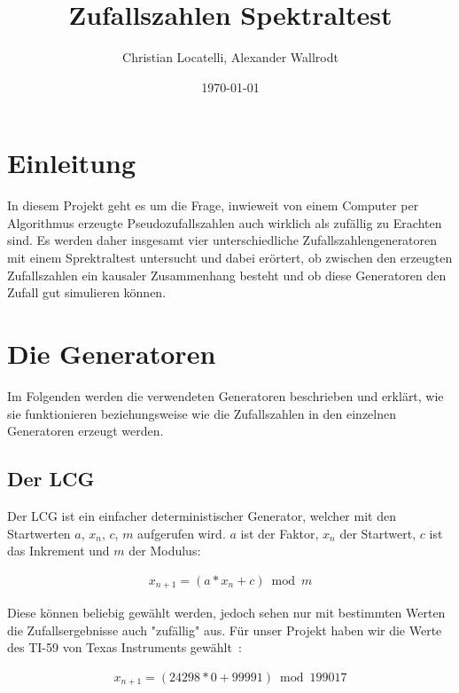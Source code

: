 \documentclass[12pt]{article}
\title{\textbf{Zufallszahlen Spektraltest}}
\author{Christian Locatelli, Alexander Wallrodt}
\date{\today}
\begin{document}
    \maketitle
    \clearpage

    \tableofcontents
    \listoftables
    \listoffigures

    \clearpage


    \section{Einleitung}\label{sec:Einleitung}
    In diesem Projekt geht es um die Frage, inwieweit von einem Computer per Algorithmus erzeugte Pseudozufallszahlen
    auch wirklich als zufällig zu Erachten sind.
    Es werden daher insgesamt vier unterschiedliche Zufallszahlengeneratoren mit einem Sprektraltest untersucht und dabei erörtert,
    ob zwischen den erzeugten Zufallszahlen ein kausaler Zusammenhang besteht
    und ob diese Generatoren den Zufall gut simulieren können.

    \section{Die Generatoren}\label{sec:die-generatoren}
    Im Folgenden werden die verwendeten Generatoren beschrieben und erklärt, wie sie funktionieren beziehungsweise wie
    die Zufallszahlen in den einzelnen Generatoren erzeugt werden.

    \subsection{Der LCG}\label{subsec:der-lcg}
    Der LCG ist ein einfacher deterministischer Generator, welcher mit den Startwerten $a$, $x_n$, $c$, $m$ aufgerufen wird.
    $a$ ist der Faktor, $x_n$ der Startwert, $c$ ist das Inkrement und $m$ der Modulus:

    \begin{align*}
    x_{n+1} = (a * x_n + c) \bmod m
    \end{align*}

    \noindent
    Diese können beliebig gewählt werden, jedoch sehen nur mit bestimmten Werten die Zufallsergebnisse auch "zufällig" aus.
    Für unser Projekt haben wir die Werte des TI-59 von Texas Instruments gewählt~\cite{lcg}:

    \begin{align*}
    x_{n+1} = (24298 * 0 + 99991) \bmod 199017
    \end{align*}
\end{document}
